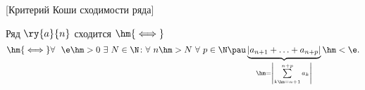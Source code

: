 [Критерий Коши сходимости ряда]

Ряд $\ry{a}{n}$ сходится $\hm{\iff}$
\[\hm{\iff} \forall\ \ \e\hm>0\ \exists\ 
N\in\N\colon \forall\  n\hm>N\ \forall\  p\in\N\pau
\underbrace{|a_{n+1}+\ldots+a_{n+p}|}_{\hm=\left|\sum\limits_{k\hm=n+1}^{n+p}a_k\right|}\hm<\e.\]

